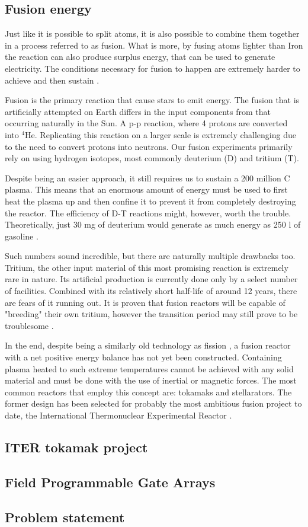 \subsection{Fusion energy}

Just like it is possible to split atoms, it is also possible to
combine them together in a process referred to as fusion. 
What is more, by fusing atoms lighter than Iron
the reaction can also produce surplus energy,
that can be used to generate electricity. 
The conditions necessary for fusion to happen are 
extremely harder to achieve and then sustain 
\cite{structural_materials_fusion}.


Fusion is the primary reaction that cause stars to emit energy.
The fusion that is artificially attempted on Earth differs in the input 
components from that occurring naturally in the Sun. 
A p-p reaction, where 4 protons are converted into ${}^{4}$He.
Replicating this reaction on a larger scale is extremely challenging 
due to the need to convert protons into neutrons.
Our fusion experiments primarily rely on using hydrogen isotopes, 
most commonly deuterium (D) and tritium (T).


Despite being an easier approach, it still requires us to sustain
a 200 million \degree C plasma. This means that an enormous amount of energy
must be used to first heat the plasma up and then confine it to 
prevent it from completely destroying the reactor. 
The efficiency of D-T reactions might, however, worth the trouble.
Theoretically, just 30 mg of deuterium would generate as much energy
as 250 l of gasoline \cite{nuclear_fusion_status}. 


Such numbers sound incredible, but there are naturally multiple drawbacks too.
Tritium, the other input material of this most promising reaction is
extremely rare in nature. Its artificial production is currently 
done only by a select number of facilities. 
Combined with its relatively short half-life of around 12 years, 
there are fears of it running out. It is proven that fusion reactors
will be capable of "breeding" their own tritium, however the transition period 
may still prove to be troublesome \cite{fusion_fuel_running_out}.


In the end, despite being a similarly old technology as fission \cite{fusion_history},
a fusion reactor with a net positive energy balance
has not yet been constructed. Containing plasma heated to such extreme
temperatures cannot be achieved with any solid material and must 
be done with the use of inertial or magnetic forces. 
The most common reactors that employ this concept are:
tokamaks and stellarators. The former design
has been selected for probably the most ambitious fusion project to date, 
the International Thermonuclear Experimental Reactor \cite{nuclear_fusion_status}.


\subsection{ITER tokamak project}


\subsection{Field Programmable Gate Arrays}


\subsection{Problem statement}

